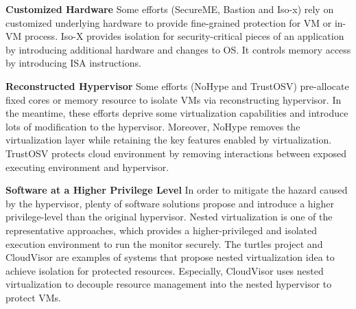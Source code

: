 \documentclass[conference]{IEEEtran}
\begin{document}
\textbf{Customized Hardware }
Some efforts (SecureME\cite{Chhabra2011SecureME}, Bastion\cite{Champagne2010Scalable} and Iso-x\cite{Evtyushkin2015Iso}) rely on 
customized underlying hardware to provide fine-grained protection for VM or in-VM process. 
Iso-X provides isolation for security-critical pieces of an application by introducing additional hardware and changes to OS. It controls memory access by introducing ISA instructions. 



\textbf{Reconstructed Hypervisor }
Some efforts (NoHype\cite{NoHype} and TrustOSV\cite{TrustOSV}) pre-allocate fixed cores or memory resource to isolate VMs via reconstructing hypervisor. In the meantime, these efforts deprive some virtualization capabilities and introduce lots of modification to the hypervisor. Moreover, NoHype removes the virtualization layer while retaining the key features enabled by virtualization. TrustOSV protects cloud environment by removing interactions between exposed executing environment and hypervisor.

 
\textbf{Software at a Higher Privilege Level}
In order to mitigate the hazard caused by the hypervisor, plenty of software solutions propose and introduce a higher privilege-level than the original hypervisor. Nested virtualization is one of the representative approaches, which provides a higher-privileged and isolated execution environment to run the monitor securely. The turtles project \cite{Ben2007The} and CloudVisor \cite{Zhang2011CloudVisor} are examples of systems that propose nested virtualization idea to achieve isolation for protected resources. Especially, CloudVisor uses nested virtualization to decouple resource management into the nested hypervisor to protect VMs. %

\end{document}
